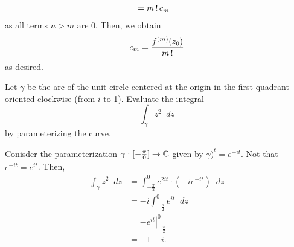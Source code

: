 \documentclass[11pt]{article}
\newcommand*\dif{\mathop{}\!d}
\begin{document}
\begin{remark}
\begin{align*}
		&= m\operatorname{!} c_m
	\end{align*}
	as all terms $n > m$ are 0. Then, we obtain
	\begin{equation*}
		c_m = \frac{f^{(m)}(z_0)}{m\operatorname{!}}
	\end{equation*}
	as desired.
	\begin{exercise}
		Let $\gamma$ be the arc of the unit circle centered at the origin in the
		first quadrant oriented clockwise (from $i$ to 1). Evaluate the integral
		\begin{equation*}
			\int_\gamma\bar{z}^2\dif z
		\end{equation*}
		by parameterizing the curve.
	\end{exercise}
	Conisder the parameterization $\gamma:[-\frac{\pi}{0}]\to\mathbb{C}$ given by
	$\gamma)^t=e^{-it}$. Not that $\bar{e^{-it}} = e^{it}$. Then,
	\begin{align*}
		\int_\gamma\bar{z}^2\dif z
		&= \int^0_{-\frac{\pi}{2}}e^{2it}\cdot(-ie^{-it}) \dif z\\
		&= -i \int^0_{-\frac{\pi}{2}}e^{it} \dif z\\
		&= \left.-e^{it}\right|^0_{-\frac{\pi}{2}}\\
		&= -1-i.
	\end{align*}
\end{remark}
\end{document}
